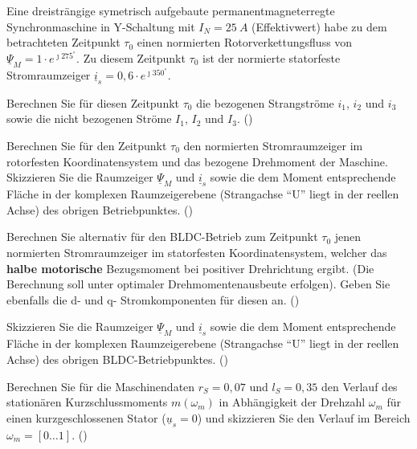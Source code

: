 \begin{question}[section=1,name={14.10.2015},mode=exm,type=bsp,tags={20151014}]
Eine dreisträngige symetrisch aufgebaute permanentmagneterregte Synchronmaschine in Y-Schaltung mit $I_N = 25~A$ (Effektivwert) habe zu dem betrachteten Zeitpunkt $\tau_0$ einen normierten Rotorverkettungsfluss von $\underline{\Psi}_M = 1 \cdot e^{\jmath 275 ^\circ}$. Zu diesem Zeitpunkt $\tau_0$ ist der normierte statorfeste Stromraumzeiger $\underline{i}_s = 0,6 \cdot e^{\jmath 350 ^\circ}$.
\begin{compactenum}
\item Berechnen Sie für diesen Zeitpunkt $\tau_0$ die bezogenen Strangströme $i_1$, $i_2$ und $i_3$ sowie die nicht bezogenen Ströme $I_1$, $I_2$ und $I_3$. ()
\item Berechnen Sie für den Zeitpunkt $\tau_0$ den normierten Stromraumzeiger im rotorfesten Koordinatensystem und das bezogene Drehmoment der Maschine. Skizzieren Sie die Raumzeiger $\underline{\Psi}_M$ und $\underline{i}_s$ sowie die dem Moment entsprechende Fläche in der komplexen Raumzeigerebene (Strangachse ``U'' liegt in der reellen Achse) des obrigen Betriebpunktes. ()
\item Berechnen Sie alternativ für den BLDC-Betrieb zum Zeitpunkt $\tau_0$ jenen normierten Stromraumzeiger im statorfesten Koordinatensystem, welcher das \textbf{halbe motorische} Bezugsmoment bei positiver Drehrichtung ergibt. (Die Berechnung soll unter optimaler Drehmomentenausbeute erfolgen). Geben Sie ebenfalls die d- und q- Stromkomponenten für diesen an. ()
\item Skizzieren Sie die Raumzeiger $\underline{\Psi}_M$ und $\underline{i}_s$ sowie die dem Moment entsprechende Fläche in der komplexen Raumzeigerebene (Strangachse ``U'' liegt in der reellen Achse) des obrigen BLDC-Betriebpunktes. ()
\item Berechnen Sie für die Maschinendaten $r_S= 0,07$ und $l_S= 0,35$ den Verlauf des stationären Kurzschlussmoments $m(\omega_m)$ in Abhängigkeit der Drehzahl $\omega_m$ für einen kurzgeschlossenen Stator ($\underline{u}_s = 0$) und skizzieren Sie den Verlauf im Bereich $\omega_m = [0\dots1]$. ()
\end{compactenum}
\end{question}

